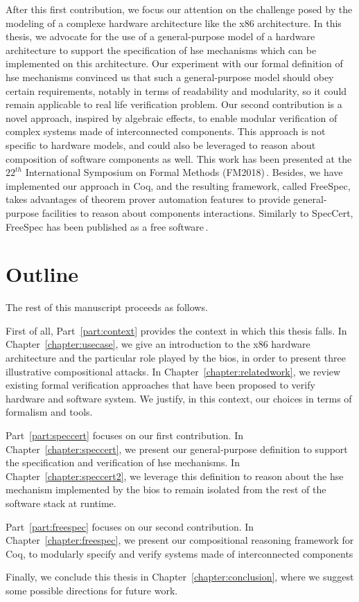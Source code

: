 After this first contribution, we focus our attention on the challenge posed by
the modeling of a complexe hardware architecture like the x86 architecture.
%
In this thesis, we advocate for the use of a general-purpose model of a hardware
architecture to support the specification of \ac{hse} mechanisms which can be
implemented on this architecture.
%
Our experiment with our formal definition of \ac{hse} mechanisms convinced us
that such a general-purpose model should obey certain requirements, notably in
terms of readability and modularity, so it could remain applicable to real life
verification problem.
%
Our second contribution is a novel approach, inspired by algebraic effects, to
enable modular verification of complex systems made of interconnected
components.
%
This approach is not specific to hardware models, and could also be leveraged to
reason about composition of software components as well.
%
This work has been presented at the $22^{th}$ International Symposium on Formal
Methods (FM2018)\,\cite{letan2018freespec}.
%
Besides, we have implemented our approach in Coq, and the resulting framework,
called FreeSpec, takes advantages of theorem prover automation features to
provide general-purpose facilities to reason about components interactions.
%
Similarly to SpecCert, FreeSpec has been published as a free
software\,\cite{letan2018freespeccode}.

\section{Outline}

The rest of this manuscript proceeds as follows.

First of all, Part~\ref{part:context} provides the context in which this thesis
falls.
%
In Chapter~\ref{chapter:usecase}, we give an introduction to the x86 hardware
architecture and the particular role played by the \ac{bios}, in order to
present three illustrative compositional attacks.
%
In Chapter~\ref{chapter:relatedwork}, we review existing formal verification
approaches that have been proposed to verify hardware and
software system.
%
We justify, in this context, our choices in terms of formalism and tools.

Part~\ref{part:speccert} focuses on our first contribution.
%
In Chapter~\ref{chapter:speccert}, we present our general-purpose definition to
support the specification and verification of
\ac{hse} mechanisms.
%
In Chapter~\ref{chapter:speccert2}, we leverage this definition to reason
about the \ac{hse} mechanism implemented by the \ac{bios} to remain isolated
from the rest of the software stack at runtime.

Part~\ref{part:freespec} focuses on our second contribution.
%
In Chapter~\ref{chapter:freespec}, we present our compositional reasoning
framework for Coq, to modularly specify and verify systems made of
interconnected components

Finally, we conclude this thesis in Chapter~\ref{chapter:conclusion}, where we
suggest some possible directions for future work.
